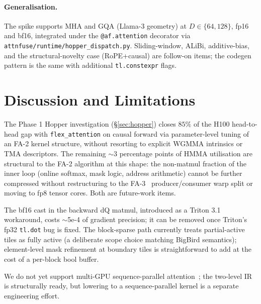 \paragraph{Generalisation.} The spike supports MHA and GQA (Llama-3
geometry) at $D \in \{64, 128\}$, fp16 and bf16, integrated under the
\texttt{@af.attention} decorator via
\texttt{attnfuse/runtime/hopper\_dispatch.py}. Sliding-window, ALiBi,
additive-bias, and the structural-novelty case (RoPE+causal) are
follow-on items; the codegen pattern is the same with additional
\texttt{tl.constexpr} flags.



\section{Discussion and Limitations}

The Phase 1 Hopper investigation (\S\ref{sec:hopper}) closes $85\%$ of
the H100 head-to-head gap with \texttt{flex\_attention} on causal
forward via parameter-level tuning of an FA-2 kernel structure,
without resorting to explicit WGMMA intrinsics or TMA descriptors.
The remaining $\sim 3$ percentage points of HMMA utilisation are
structural to the FA-2 algorithm at this shape: the non-matmul
fraction of the inner loop (online softmax, mask logic, address
arithmetic) cannot be further compressed without restructuring to the
FA-3~\cite{shah2024flashattention3} producer/consumer warp split or
moving to fp8 tensor cores. Both are future-work items.

The bf16 cast in the backward dQ matmul, introduced as a Triton 3.1
workaround, costs $\sim$5e-4 of gradient precision; it can be removed
once Triton's fp32 \texttt{tl.dot} bug is fixed. The block-sparse path
currently treats partial-active tiles as fully active (a deliberate
scope choice matching BigBird semantics); element-level mask
refinement at boundary tiles is straightforward to add at the cost of
a per-block bool buffer.

We do not yet support multi-GPU sequence-parallel
attention~\cite{liu2023ring}; the two-level IR is structurally ready,
but lowering to a sequence-parallel kernel is a separate engineering
effort.



